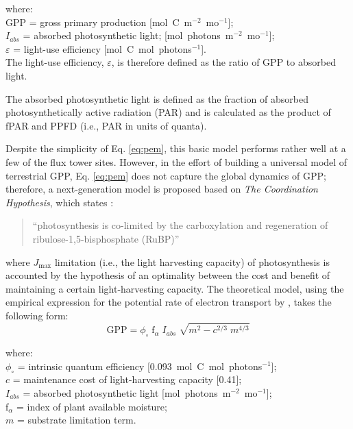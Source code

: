 \noindent where:\\
\indent GPP = gross primary production [mol~C~m$^{-2}$~mo$^{-1}$];\\
\indent $I_{abs}$ = absorbed photosynthetic light; [mol~photons~m$^{-2}$~mo$^{-1}$];\\
\indent $\varepsilon$ = light-use efficiency [mol~C~mol~photons$^{-1}$].\\

\noindent The light-use efficiency, $\varepsilon$, is therefore defined as the ratio of GPP to absorbed light. 

The absorbed photosynthetic light is defined as the fraction of absorbed photosynthetically active radiation (PAR) and is calculated as the product of fPAR and PPFD (i.e., PAR in units of quanta).

Despite the simplicity of Eq. \ref{eq:pem}, this basic model performs rather well at a few of the flux tower sites. 
However, in the effort of building a universal model of terrestrial GPP, Eq. \ref{eq:pem} does not capture the global dynamics of GPP; therefore, a next-generation model is proposed based on \emph{The Coordination Hypothesis}, which states \parencite{maire12}:
\begin{quote}
	``photosynthesis is co-limited by the carboxylation and regeneration of ribulose-1,5-bisphosphate (RuBP)''
\end{quote}
where $J_\text{max}$ limitation (i.e., the light harvesting capacity) of photosynthesis is accounted by the hypothesis of an optimality between the cost and benefit of maintaining a certain light-harvesting capacity.
The theoretical model, using the empirical expression for the potential rate of electron transport by \cite{smith37}, takes the following form:
\begin{equation}
\label{eq:nglue}
    \text{GPP} = \phi_{\circ}\; \text{f}_\alpha\; I_{abs}\; \sqrt{m^2 - c^{2/3}\; m^{4/3}}
\end{equation}

\noindent where:\\
\indent $\phi_{\circ}$ = intrinsic quantum efficiency [0.093~mol~C~mol~photons$^{-1}$];\\
\indent $c$ = maintenance cost of light-harvesting capacity [0.41];\\
\indent $I_{abs}$ = absorbed photosynthetic light [mol~photons~m$^{-2}$~mo$^{-1}$];\\
\indent f$_\alpha$ = index of plant available moisture;\\
\indent $m$ = substrate limitation term.\\

